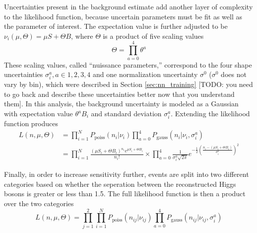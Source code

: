     Uncertainties present in the background estimate add another layer of complexity to the likelihood function,
        because uncertain parameters must be fit as well as the parameter of interest.
    The expectation value is further adjusted to be $\nu_i(\mu, \Theta) = \mu S + \Theta B$,
        where $\Theta$ is a product of five scaling values 
    \begin{equation}
        \Theta = \prod \limits_{a=0}^{4}  \theta^a
    \end{equation}
    These scaling values, called ``nuissance parameters,''
        correspond to the four shape uncertainties $\sigma_i^a, a\in{1,2,3,4}$
        and one normalization uncertainty $\sigma^0$ ($\sigma^0$ does not vary by bin),
        which were described in Section \ref{sec:nn_training}
        [TODO: you need to go back and describe these uncertainties better now that you understand them].
    In this analysis, the background uncertainty is modeled as a Gaussian
        with expectation value $\theta^a B_i$ and standard deviation $\sigma_i^a$.
    Extending the likelihood function produces
    \begin{equation} \begin{split}
        L(n,\mu,\Theta) &= \prod \limits_{i=1}^{N} P_{\textrm{poiss}}(n_i | \nu_i) 
             \prod \limits_{a=0}^{4} P_{\textrm{gauss}}(n_i | \nu_i, \sigma_i^a) 
        \\&= \prod \limits_{i=1}^{N} \frac{ (\mu S_i + \Theta B_i)^{n_i} e^{\mu S_i + \Theta B_i} }{n_i!} \times
            \prod \limits_{a=0}^4 \frac{1}{\sigma_i^a \sqrt{2\pi}} e^{
                -\frac{1}{2}\left(\frac{n_i- (\mu S_i + \Theta B_i)}{\sigma_i^a}\right)^2
            }
    \end{split} \end{equation}

    Finally, in order to increase sensitivity further, events are split into two different categories
        based on whether the \deta seperation between the reconstructed Higgs bosons is greater or less than 1.5.
    The full likelihood function is then a product over the two categories
    \begin{equation}
        L(n,\mu,\Theta) = \prod \limits_{j=1}^{2}
             \prod \limits_{i=1}^{N} P_{\textrm{poiss}}(n_{ij} | \nu_{ij}) 
             \prod \limits_{a=0}^{4} P_{\textrm{gauss}}(n_{ij} | \nu_{ij}, \sigma_{i}^a) 
    \end{equation}


